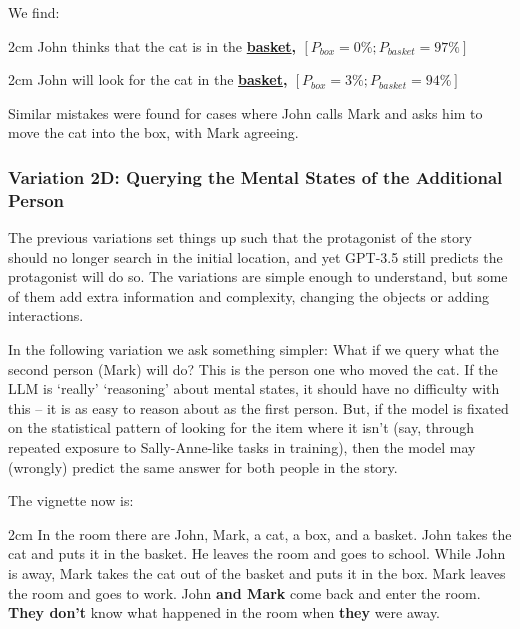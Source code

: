 \documentclass{article}
\begin{document}
We find:

\begin{adjustwidth}{2cm}{}
John thinks that the cat is in the \textbf{\underline{basket}, $[P_{box} = 0\%; P_{basket} = 97\%]$}
\end{adjustwidth}

\begin{adjustwidth}{2cm}{}
John will look for the cat in the \textbf{\underline{basket}, $[P_{box} = 3\%; P_{basket} = 94\%]$}
\end{adjustwidth}

Similar mistakes were found for cases where John calls Mark and asks him to move the cat into the box, with Mark agreeing. 

\subsubsection{Variation 2D: Querying the Mental States of the Additional Person}

The previous variations set things up such that the protagonist of the story should no longer search in the initial location, and yet GPT-3.5 still predicts the protagonist will do so. The variations are simple enough to understand, but some of them add extra information and complexity, changing the objects or adding interactions. 

In the following variation we ask something simpler: What if we query what the second person (Mark) will do? This is the person one who moved the cat. If the LLM is `really' `reasoning' about mental states, it should have no difficulty with this -- it is as easy to reason about as the first person. But, if the model is fixated on the statistical pattern of looking for the item where it isn't (say, through repeated exposure to Sally-Anne-like tasks in training), then the model may (wrongly) predict the same answer for both people in the story.

The vignette now is:

\begin{adjustwidth}{2cm}{}
In the room there are John, Mark, a cat, a box, and a basket. John takes the cat and puts it in the basket. He leaves the room and goes to school. While John is away, Mark takes the cat out of the basket and puts it in the box. Mark leaves the room and goes to work. John \textbf{and Mark} come back and enter the room. \textbf{They don't} know what happened in the room when \textbf{they} were away.
\end{adjustwidth}
\end{document}
